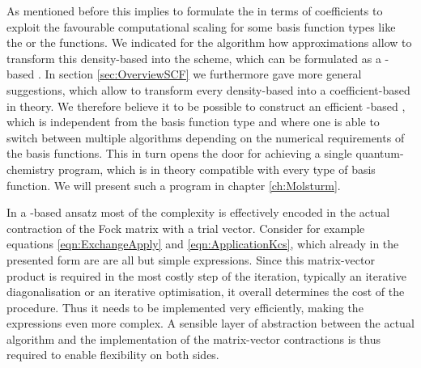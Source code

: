 As mentioned before this implies to formulate the \SCF in terms of coefficients
to exploit the favourable computational scaling
for some basis function types like the \FE or the \CS functions.
We indicated for the \ODA algorithm
how approximations allow to transform this density-based
\SCF into the \tODA scheme,
which can be formulated as a \contract-based \SCF.
In section \vref{sec:OverviewSCF} we furthermore gave more general suggestions,
which allow to transform every density-based \SCF
into a coefficient-based \SCF in theory.
We therefore believe it to be possible
to construct an efficient \contract-based \SCF,
which is independent from the basis function type
and where one is able to switch between
multiple algorithms depending on the numerical requirements of the basis functions.
This in turn opens the door
for achieving a single quantum-chemistry program,
which is in theory compatible with every type of basis function.
We will present such a program in chapter \vref{ch:Molsturm}.

In a \contract-based ansatz most of the complexity is effectively
encoded in the actual contraction of the Fock matrix with a trial vector.
Consider for example equations \eqref{eqn:ExchangeApply}
and \eqref{eqn:ApplicationKcs},
which already in the presented form are are all but simple expressions.
Since this matrix-vector product is required in the most costly step
of the \SCF iteration,
typically an iterative diagonalisation or an iterative optimisation,
it overall determines the cost of the procedure.
Thus it needs to be implemented very efficiently,
making the expressions even more complex.
A sensible layer of abstraction between the actual \SCF algorithm
and the implementation of the matrix-vector contractions
is thus required to enable flexibility on both sides.
